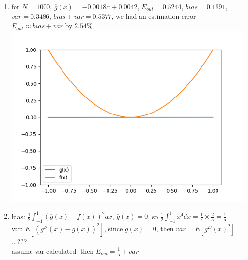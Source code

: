 \documentclass{article}
\begin{document}
\begin{enumerate}
\begin{enumerate}[label=(\alph*)]
            \item for $N = 1000$, $\overline{g}(x) = -0.0018x + 0.0042$, $E_{out} = 0.5244$, $bias = 0.1891$, $var = 0.3486$, $bias + var = 0.5377$, we had an estimation error $E_{out} \approx bias + var$ by $2.54\%$\\
            \includegraphics[scale=0.5]{images/2_24.png}

            \item bias: $\frac{1}{2}\int_{-1}^{1}(\overline{g}(x) - f(x))^2dx$, $\overline{g}(x) = 0$, so $\frac{1}{2}\int_{-1}^{1}x^4dx = \frac{1}{2} \times \frac{2}{5} = \frac{1}{5}$\\
            var: $E[(g^D(x) - \overline{g}(x))^2]$, since $\overline{g}(x) = 0$, then $var = E[g^D(x)^2]$...???\\
            assume var calculated, then $E_{out} = \frac{1}{5} + var$
        \end{enumerate}
    \end{enumerate}
\end{document}
